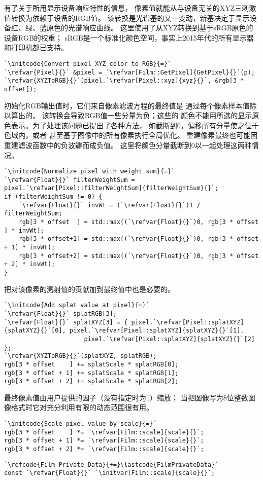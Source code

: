 有了关于所用显示设备响应特性的信息，
像素值就能从与设备无关的XYZ三刺激值转换为依赖于设备的RGB值。
该转换是光谱基的又一变动，新基决定于显示设备红、绿、蓝原色的光谱响应曲线。
这里使用了从XYZ转换到基于sRGB原色的设备RGB的权重；
sRGB是一个标准化颜色空间，事实上2015年代的所有显示器和打印机都已支持。
\begin{lstlisting}
`\initcode{Convert pixel XYZ color to RGB}{=}`
`\refvar{Pixel}{}` &pixel = `\refvar[Film::GetPixel]{GetPixel}{}`(p);
`\refvar{XYZToRGB}{}`(pixel.`\refvar[Pixel::xyz]{xyz}{}`, &rgb[3 * offset]);
\end{lstlisting}

初始化RGB输出值时，它们来自像素滤波方程的最终值是
通过每个像素样本值除以算出的。
该转换会导致RGB值一些分量为负；这些的
颜色不能用所选的显示原色表示。为了处理该问题已提出了各种方法，
如截断到0，偏移所有分量使之位于色域内，或者
甚至基于图像中的所有像素执行全局优化。
重建像素最终也可能因重建滤波函数中的负波瓣而成负值。
这里将颜色分量截断到0以一起处理这两种情况。
\begin{lstlisting}
`\initcode{Normalize pixel with weight sum}{=}`
`\refvar{Float}{}` filterWeightSum = pixel.`\refvar[Pixel::filterWeightSum]{filterWeightSum}{}`;
if (filterWeightSum != 0) {
    `\refvar{Float}{}` invWt = (`\refvar{Float}{}`)1 / filterWeightSum;
    rgb[3 * offset  ] = std::max((`\refvar{Float}{}`)0, rgb[3 * offset    ] * invWt);
    rgb[3 * offset+1] = std::max((`\refvar{Float}{}`)0, rgb[3 * offset + 1] * invWt);
    rgb[3 * offset+2] = std::max((`\refvar{Float}{}`)0, rgb[3 * offset + 2] * invWt);
}
\end{lstlisting}

把对该像素的溅射值的贡献加到最终值中也是必要的。
\begin{lstlisting}
`\initcode{Add splat value at pixel}{=}`
`\refvar{Float}{}` splatRGB[3];
`\refvar{Float}{}` splatXYZ[3] = { pixel.`\refvar[Pixel::splatXYZ]{splatXYZ}{}`[0], pixel.`\refvar[Pixel::splatXYZ]{splatXYZ}{}`[1],
                      pixel.`\refvar[Pixel::splatXYZ]{splatXYZ}{}`[2] };
`\refvar{XYZToRGB}{}`(splatXYZ, splatRGB);
rgb[3 * offset    ] += splatScale * splatRGB[0];
rgb[3 * offset + 1] += splatScale * splatRGB[1];
rgb[3 * offset + 2] += splatScale * splatRGB[2];
\end{lstlisting}

最终像素值由用户提供的因子（没有指定时为1）缩放；
当把图像写为8位整数图像格式时它对充分利用有限的动态范围很有用。
\begin{lstlisting}
`\initcode{Scale pixel value by scale}{=}`
rgb[3 * offset    ] *= `\refvar[Film::scale]{scale}{}`;
rgb[3 * offset + 1] *= `\refvar[Film::scale]{scale}{}`;
rgb[3 * offset + 2] *= `\refvar[Film::scale]{scale}{}`;
\end{lstlisting}
\begin{lstlisting}
`\refcode{Film Private Data}{+=}\lastcode{FilmPrivateData}`
const `\refvar{Float}{}` `\initvar[Film::scale]{scale}{}`;
\end{lstlisting}

